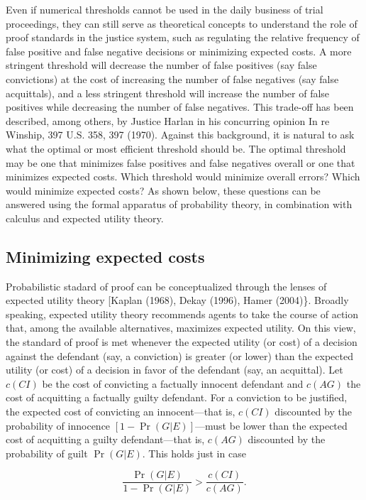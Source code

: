 \documentclass[10pt,dvipsnames]{scrartcl}
\begin{document}
Even if numerical thresholds cannot be used in the daily business of
trial proceedings, they can still serve as theoretical concepts to
understand the role of proof standards in the justice system, such as
regulating the relative frequency of false positive and false negative
decisions or minimizing expected costs. A more stringent threshold will
decrease the number of false positives (say false convictions) at the
cost of increasing the number of false negatives (say false acquittals),
and a less stringent threshold will increase the number of false
positives while decreasing the number of false negatives. This trade-off
has been described, among others, by Justice Harlan in his concurring
opinion In re Winship, 397 U.S. 358, 397 (1970). Against this
background, it is natural to ask what the optimal or most efficient
threshold should be. The optimal threshold may be one that minimizes
false positives and false negatives overall or one that minimizes
expected costs. Which threshold would minimize overall errors? Which
would minimize expected costs? As shown below, these questions can be
answered using the formal apparatus of probability theory, in
combination with calculus and expected utility theory.

\subsection{Minimizing expected costs}

Probabilistic stadard of proof can be conceptualized through the lenses
of expected utility theory {[}Kaplan (1968), Dekay (1996), Hamer
(2004)\}. Broadly speaking, expected utility theory recommends agents to
take the course of action that, among the available alternatives,
maximizes expected utility. On this view, the standard of proof is met
whenever the expected utility (or cost) of a decision against the
defendant (say, a conviction) is greater (or lower) than the expected
utility (or cost) of a decision in favor of the defendant (say, an
acquittal). Let \(c(CI)\) be the cost of convicting a factually innocent
defendant and \(c(AG)\) the cost of acquitting a factually guilty
defendant. For a conviction to be justified, the expected cost of
convicting an innocent---that is, \(c(CI)\) discounted by the
probability of innocence \([1-\Pr(G|E)]\)---must be lower than the
expected cost of acquitting a guilty defendant---that is, \(c(AG)\)
discounted by the probability of guilt \(\Pr(G|E)\). This holds just in
case

\[ \frac{\Pr(G|E)}{1- \Pr(G|E)} > \frac{c(CI)}{c(AG)}.\]
\end{document}
